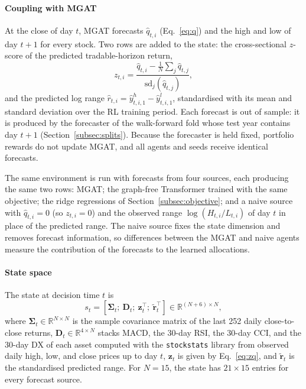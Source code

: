 \paragraph{Coupling with MGAT}
{\color{blue}At the close of day $t$, MGAT forecasts $\hat q_{t,i}$ (Eq.~\eqref{eq:q}) and the high and low of day $t+1$ for every stock. Two rows are added to the state: the cross-sectional $z$-score of the predicted tradable-horizon return,
\begin{equation}
z_{t,i}=\frac{\hat q_{t,i}-\frac1N\sum_{j}\hat q_{t,j}}{\mathrm{sd}_j(\hat q_{t,j})},
\label{eq:zq}
\end{equation}
and the predicted log range $\hat r_{t,i}=\hat y^{h}_{t,i,1}-\hat y^{l}_{t,i,1}$, standardised with its mean and standard deviation over the RL training period. Each forecast is out of sample: it is produced by the forecaster of the walk-forward fold whose test year contains day $t+1$ (Section~\ref{subsec:splits}). Because the forecaster is held fixed, portfolio rewards do not update MGAT, and all agents and seeds receive identical forecasts.

The same environment is run with forecasts from four sources, each producing the same two rows: MGAT; the graph-free Transformer trained with the same objective; the ridge regressions of Section~\ref{subsec:objective}; and a naive source with $\hat q_{t,i}=0$ (so $z_{t,i}=0$) and the observed range $\log(H_{t,i}/L_{t,i})$ of day $t$ in place of the predicted range. The naive source fixes the state dimension and removes forecast information, so differences between the MGAT and naive agents measure the contribution of the forecasts to the learned allocations.\par}

\paragraph{State space}
{\color{blue}The state at decision time $t$ is
\begin{equation}
s_t=\left[\boldsymbol{\Sigma}_{t};\ \mathbf{D}_{t};\ \mathbf{z}_{t}^{\top};\ \tilde{\mathbf{r}}_{t}^{\top}\right]\in\mathbb{R}^{(N+6)\times N},
\label{eq:state}
\end{equation}
where $\boldsymbol{\Sigma}_{t}\in\mathbb{R}^{N\times N}$ is the sample covariance matrix of the last 252 daily close-to-close returns, $\mathbf{D}_{t}\in\mathbb{R}^{4\times N}$ stacks MACD, the 30-day RSI, the 30-day CCI, and the 30-day DX of each asset computed with the \texttt{stockstats} library from observed daily high, low, and close prices up to day $t$, $\mathbf{z}_t$ is given by Eq.~\eqref{eq:zq}, and $\tilde{\mathbf{r}}_t$ is the standardised predicted range. For $N=15$, the state has $21\times15$ entries for every forecast source.\par}

